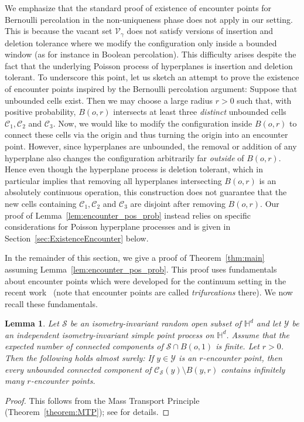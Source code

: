 \documentclass[12pt,a4paper]{article}
\newtheorem{lemma}[proposition]{Lemma}
\theoremstyle{definition}
\begin{document}
We emphasize that the standard proof of existence of encounter points for Bernoulli percolation in the non-uniqueness phase \cite{BK89} does not apply in our setting. This is because the vacant set $\mathcal{V}_\gamma$ does not satisfy versions of insertion and deletion tolerance where we modify the configuration only inside a bounded window (as for instance in Boolean percolation). This difficulty arises despite the fact that the underlying Poisson process of hyperplanes is insertion and deletion tolerant. To underscore this point, let us sketch an attempt to prove the existence of encounter points inspired by the Bernoulli percolation argument: Suppose that unbounded cells exist. Then we may choose a large radius $r>0$ such that, with positive probability, $B(o,r)$ intersects at least three {\em distinct} unbounded cells $\mathcal C_1,\mathcal C_2$ and $\mathcal C_3$. Now, we would like to modify the configuration inside $B(o,r)$ to connect these cells via the origin and thus turning the origin into an encounter point. However, since hyperplanes are unbounded, the removal or addition of any hyperplane also changes the configuration arbitrarily far {\em outside} of $B(o,r)$. Hence even though the hyperplane process is deletion tolerant, which in particular implies that removing all hyperplanes intersecting $B(o,r)$ is an absolutely continuous operation, this construction does not guarantee that the new cells containing $\mathcal C_1,\mathcal C_2$ and $\mathcal C_3$ are disjoint after removing $B(o,r)$. Our proof of Lemma~\ref{lem:encounter_pos_prob} instead relies on specific considerations for Poisson hyperplane processes and is given in Section~\ref{sec:ExistenceEncounter} below.

In the remainder of this section, we give a proof of Theorem~\ref{thm:main} assuming Lemma~\ref{lem:encounter_pos_prob}. This proof uses fundamentals about encounter points which were developed for the continuum setting in the recent work~\cite{MS25} (note that encounter points are called {\em trifurcations} there). We now recall these fundamentals.

\begin{lemma}\label{lm:MoreEncounter}
Let $\mathcal S$ be an isometry-invariant random open subset of $\mathbb H^d$ and let $\mathcal Y$ be an independent isometry-invariant simple point process on $\mathbb H^d$. Assume that the expected number of connected components of $\mathcal S \cap B(o,1)$ is finite. Let $r>0$. Then the following holds almost surely: If $y\in \mathcal Y$ is an $r$-encounter point, then every unbounded connected component of $\mathcal C_{\mathcal S}(y)\setminus B(y,r)$ contains infinitely many $r$-encounter points.
\end{lemma}
\begin{proof} This follows from the Mass Transport Principle (Theorem~\ref{theorem:MTP}); see \cite[Lemma~4.2]{MS25} for details.
\end{proof}
\end{document}
